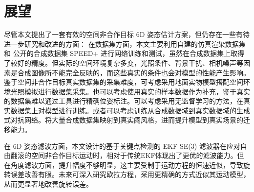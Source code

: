 \section{展望}

尽管本文提出了一套有效的空间非合作目标 6D 姿态估计方案，但仍存在一些有待进一步研究和改进的方面：
在数据集方面，本文主要利用自建的仿真渲染数据集和 公开的合成数据集 SPEED+ 进行网络训练和测试，虽然在合成数据集上取得了较好的精度。但实际的空间环境复杂多变，光照条件、背景干扰、相机噪声等因素是合成图像所不能完全反映的，而这些真实的条件也会对模型的性能产生影响。鉴于空间非合作目标真实数据集的采集难度，可考虑采用地面实物模型搭配空间环境光照模拟进行数据集采集。也可以考虑使用真实的样本数据作为补充，鉴于真实的数据集难以通过工具进行精确位姿标注。可以考虑采用无监督学习的方法，在真实数据集上对模型进行训练。或者可以考虑训练从合成数据域到真实数据域的生成式对抗网络。将大量合成数据集映射到真实阈风格，进而提升模型到真实场景的迁移能力。

在 6D 姿态滤波方面，本文设计的基于关键点检测的 EKF SE(3) 滤波器在应对自由翻滚的空间非合作目标运动时，相对于传统EKF体现出了更优的滤波能力。但在角度滤波方面，提升幅度不够明显，这主要受制于运动方程的恒速近似，导致旋转误差改善有限。未来可深入研究欧拉方程，采用更精确的方式近似其运动模型，从而更显著地改善旋转误差。
